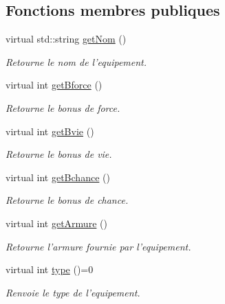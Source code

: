 \subsection*{Fonctions membres publiques}
\begin{DoxyCompactItemize}
\item 
virtual std\-::string \hyperlink{class_equipement_a0b0426a70bfce6e7c3efac605b75cd8e}{get\-Nom} ()
\begin{DoxyCompactList}\small\item\em Retourne le nom de l'equipement. \end{DoxyCompactList}\item 
virtual int \hyperlink{class_equipement_aabcf10fd762945fa4a37a9cf8321f463}{get\-Bforce} ()
\begin{DoxyCompactList}\small\item\em Retourne le bonus de force. \end{DoxyCompactList}\item 
virtual int \hyperlink{class_equipement_ad9fd7528c4f181970b7a0877f4145f89}{get\-Bvie} ()
\begin{DoxyCompactList}\small\item\em Retourne le bonus de vie. \end{DoxyCompactList}\item 
virtual int \hyperlink{class_equipement_a73485135eacdf30d5f49c9e34e5f4d0e}{get\-Bchance} ()
\begin{DoxyCompactList}\small\item\em Retourne le bonus de chance. \end{DoxyCompactList}\item 
virtual int \hyperlink{class_equipement_a8577d49fd00b8effa39388feccb29901}{get\-Armure} ()
\begin{DoxyCompactList}\small\item\em Retourne l'armure fournie par l'equipement. \end{DoxyCompactList}\item 
virtual int \hyperlink{class_equipement_a05b2c9d4cf22b6aefb6603fa4e322aa2}{type} ()=0
\begin{DoxyCompactList}\small\item\em Renvoie le type de l'equipement. \end{DoxyCompactList}\end{DoxyCompactItemize}
